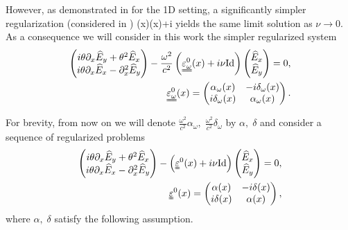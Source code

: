 However, as demonstrated in \cite{singular_solutions} for the 1D setting, a significantly simpler regularization (considered in \cite{Despres_2014})
\ben
\uuline{\varepsilon_{\omega}^{\nu}}(x)\approx {}(x)+i\nu {}
\een
yields the same limit solution as $\nu\rightarrow 0$.
As a consequence we will consider in this work the simpler regularized system
\begin{align*}
\left(
\begin{matrix}
 i\theta \partial_x \widehat{E}_y+\theta^2 \widehat{E}_x\\
 i\theta \partial_x \widehat{E}_x -\partial_x^2 \widehat{E}_y
\end{matrix}
\right)-\frac{\omega^2}{c^2}
\left(\uuline{\varepsilon_{\omega}^{0}}(x)+i\nu \mathrm{Id}\right)\left(
\begin{matrix}
 \widehat{E}_x\\
 \widehat{E}_y
\end{matrix}
\right)
=0,\\
\uuline{\varepsilon_{\omega}^{0}}(x)=\left(
\begin{matrix}
 \alpha_{\omega}(x) & -i\delta_{\omega}(x) \\
 i\delta_{\omega}(x) & \alpha_{\omega}(x)
\end{matrix}
\right). 
\end{align*}

For brevity, from now on we will denote $\frac{\omega^2}{c^2}\alpha_{\omega},\; \frac{\omega^2}{c^2}\delta_{\omega}$ by $\alpha,\; \delta$ and consider a sequence of regularized problems 
\begin{align}
\label{eq:main_frequency_domain}
\left(
\begin{matrix}
 i\theta \partial_x \widehat{E}_y+\theta^2 \widehat{E}_x\\
 i\theta \partial_x \widehat{E}_x -\partial_x^2 \widehat{E}_y
\end{matrix}
\right)-
\left(\uuline{\varepsilon}^{0}(x)+i\nu \mathrm{Id}\right)\left(
\begin{matrix}
 \widehat{E}_x\\
 \widehat{E}_y
\end{matrix}
\right)
=0,\\
\label{eq:epsilon_0}
\uuline{\varepsilon}^{0}(x)=\left(
\begin{matrix}
 \alpha(x) & -i\delta(x) \\
 i\delta(x) & \alpha(x)
\end{matrix}
\right),
\end{align}
where $\alpha,\;\delta$ satisfy the following assumption.


